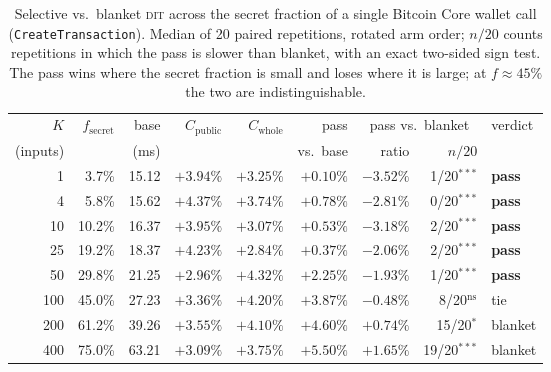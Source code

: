 \begin{table}[t]\centering\small
\caption{Selective vs.\ blanket \textsc{dit} across the secret fraction of a single Bitcoin Core wallet call (\texttt{CreateTransaction}). Median of 20 paired repetitions, rotated arm order; $n/20$ counts repetitions in which the pass is slower than blanket, with an exact two-sided sign test. The pass wins where the secret fraction is small and loses where it is large; at $f\approx45\%$ the two are indistinguishable.}
\label{tab:btc-fsweep}
\begin{tabular}{rrrrrrrrl}\toprule
$K$ & $f_{\mathrm{secret}}$ & base & $C_{\mathrm{public}}$ & $C_{\mathrm{whole}}$ & pass & \multicolumn{2}{c}{pass vs.\ blanket} & verdict\\
(inputs) & & (ms) & & & vs.\ base & ratio & $n/20$ & \\\midrule
1 & 3.7\% & 15.12 & $+3.94\%$ & $+3.25\%$ & $+0.10\%$ & $-3.52\%$ & 1/20$^{***}$ & \textbf{pass}\\
4 & 5.8\% & 15.62 & $+4.37\%$ & $+3.74\%$ & $+0.78\%$ & $-2.81\%$ & 0/20$^{***}$ & \textbf{pass}\\
10 & 10.2\% & 16.37 & $+3.95\%$ & $+3.07\%$ & $+0.53\%$ & $-3.18\%$ & 2/20$^{***}$ & \textbf{pass}\\
25 & 19.2\% & 18.37 & $+4.23\%$ & $+2.84\%$ & $+0.37\%$ & $-2.06\%$ & 2/20$^{***}$ & \textbf{pass}\\
50 & 29.8\% & 21.25 & $+2.96\%$ & $+4.32\%$ & $+2.25\%$ & $-1.93\%$ & 1/20$^{***}$ & \textbf{pass}\\
100 & 45.0\% & 27.23 & $+3.36\%$ & $+4.20\%$ & $+3.87\%$ & $-0.48\%$ & 8/20$^{\mathrm{ns}}$ & tie\\
200 & 61.2\% & 39.26 & $+3.55\%$ & $+4.10\%$ & $+4.60\%$ & $+0.74\%$ & 15/20$^{*}$ & blanket\\
400 & 75.0\% & 63.21 & $+3.09\%$ & $+3.75\%$ & $+5.50\%$ & $+1.65\%$ & 19/20$^{***}$ & blanket\\
\bottomrule\end{tabular}
\end{table}
